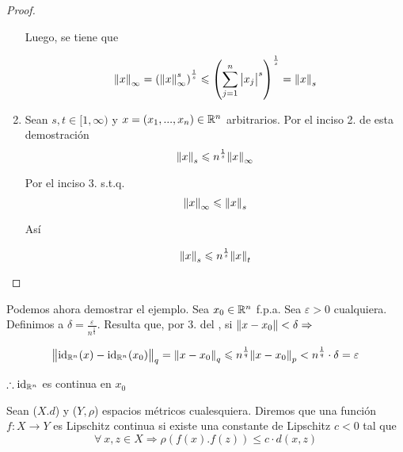 \begin{proof}
\begin{enumerate}
        Luego, se tiene que

        \begin{equation*}
            {\norm{x}}_{\infty} = {({\norm{x}}^{s}_{\infty} )}^{\frac{1}{s}} \leqslant {\left( \sum_{j=1}^{n} {\abs{{x}_{j}}}^{s}  \right)}^{\frac{1}{s}} = {\norm{x}}_{s}
        \end{equation*}
        \item Sean $s,t \in [1,\infty)$  y $x=(x_1,...,x_n) \in \mathbb{R}^n$ arbitrarios. Por el inciso 2. de esta demostración
        \begin{equation*}
            {\norm{x}}_{s} \leqslant {n}^{\frac{1}{s}} {\norm{x}}_{\infty}
        \end{equation*}

        Por el inciso 3. s.t.q.
        \begin{equation*}
            {\norm{x}}_{\infty} \leqslant {\norm{x}}_{s}
        \end{equation*}

        Así

        \begin{equation*}
            {\norm{x}}_{s} \leqslant {n}^{\frac{1}{s}} {\norm{x}}_{t}
        \end{equation*}
    \end{enumerate}
\end{proof}

\begin{proofexplanation}
    Podemos ahora demostrar el ejemplo. Sea $x_0 \in \mathbb{R}^n$ f.p.a. Sea $\varepsilon > 0 $ cualquiera. Definimos a $\delta = \frac{\varepsilon}{{n}^{\frac{1}{q}}}$. Resulta que, por 3. del , si $\norm{x-x_0} < \delta \Rightarrow$

    \begin{equation*}
        {\norm{{\mathrm{id}}_{\ensuremath{\mathbb{R}}^n}(x)-{\mathrm{id}}_{\ensuremath{\mathbb{R}}^n}(x_0)}}_{q} = {\norm{x-x_0}}_{q} \leqslant {n}^{\frac{1}{q}} {\norm{x-x_0}}_{p} < {n}^{\frac{1}{q}} \cdot \delta = \varepsilon
    \end{equation*}

    $\therefore {\mathrm{id}}_{\mathbb{R}^n}$ es continua en $x_0$
\end{proofexplanation}

\begin{definition} \label{def22} 
    Sean ($X.d$) y ($Y, \rho$) espacios métricos cualesquiera. Diremos que una función $ f : X \to Y$ es Lipschitz continua si existe una constante de Lipschitz $c < 0$ tal que
    \begin{equation*}
        \forall \: x,z \in X \Rightarrow \rho(f(x).f(z)) \leqslant c \cdot d(x,z)
    \end{equation*}
\end{definition}

